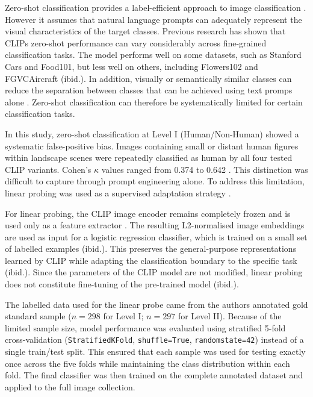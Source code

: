 \documentclass[11pt]{article}
\renewcommand{\_}{\textunderscore\allowbreak{}}
\begin{document}
Zero-shot classification provides a label-efficient approach to image classification \citep{liao_mapping_2025}. However it assumes that natural language prompts can adequately represent the visual characteristics of the target classes. Previous research has shown that CLIPs zero-shot performance can vary considerably across fine-grained classification tasks\citep{radford_learning_2021}. The model performs well on some datasets, such as Stanford Cars and Food101, but less well on others, including Flowers102 and FGVCAircraft (ibid.). In addition, visually or semantically similar classes can reduce the separation between classes that can be achieved using text promps alone \citep{liao_mapping_2025}. Zero-shot classification can therefore be systematically limited for certain classification tasks.

In this study, zero-shot classification at Level I (Human/Non-Human) showed a systematic false-positive bias. Images containing small or distant human figures within landscape scenes were repeatedly classified as human by all four tested CLIP variants. Cohen's $\kappa$ values ranged from 0.374 to 0.642 \citep{cohen_coefficient_1960}. This distinction was difficult to capture through prompt engineering alone. To address this limitation, linear probing was used as a supervised adaptation strategy \citep{radford_learning_2021}.

For linear probing, the CLIP image encoder remains completely frozen and is used only as a feature extractor \citep{radford_learning_2021}. The resulting L2-normalised image embeddings are used as input for a logistic regression classifier, which is trained on a small set of labelled examples (ibid.). This preserves the general-purpose representations learned by CLIP while adapting the classification boundary to the specific task (ibid.). Since the parameters of the CLIP model are not modified, linear probing does not constitute fine-tuning of the pre-trained model (ibid.).

The labelled data used for the linear probe came from the authors annotated gold standard sample ($n = 298$ for Level I; $n = 297$ for Level II). Because of the limited sample size, model performance was evaluated using stratified 5-fold cross-validation (\texttt{StratifiedKFold}, \texttt{shuffle=True}, \texttt{random\_state=42}) instead of a single train/test split. This ensured that each sample was used for testing exactly once across the five folds while maintaining the class distribution within each fold. The final classifier was then trained on the complete annotated dataset and applied to the full image collection.
\end{document}
